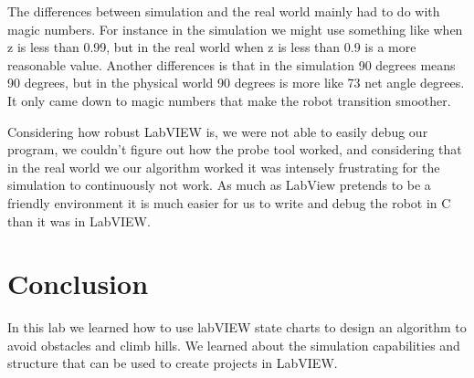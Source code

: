 \documentclass[10pt,titlepage]{article}
\begin{document}
    The differences between simulation and the real world mainly had to do with magic numbers. For instance in the simulation we might use something like when z is less than 0.99, but in the real world when z is less than 0.9 is a more reasonable value. Another differences is that in the simulation 90 degrees means 90 degrees, but in the physical world 90 degrees is more like 73 net angle degrees. It only came down to magic numbers that make the robot transition smoother.

    Considering how robust LabVIEW is, we were not able to easily debug our program, we couldn't figure out how the probe tool worked, and considering that in the real world we our algorithm worked it was intensely frustrating for the simulation to continuously not work. As much as LabView pretends to be a friendly environment it is much easier for us to write and debug the robot in C than it was in LabVIEW.

  \section{Conclusion}
    In this lab we learned how to use labVIEW state charts to design an algorithm to avoid obstacles and climb hills. We learned about the simulation capabilities and structure that can be used to create projects in LabVIEW. 
\end{document}
